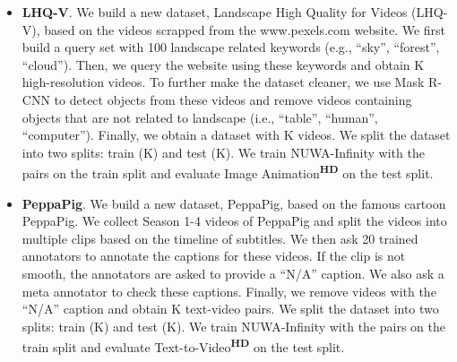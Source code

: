 \documentclass{article}
\begin{document}
\begin{itemize}[leftmargin=*]
\item \textbf{LHQ-V}. We build a new dataset, Landscape High Quality for Videos (LHQ-V), based on the videos scrapped from the www.pexels.com website. We first build a query set with 100 landscape related keywords (e.g., ``sky'', ``forest'', ``cloud''). Then, we query the website using these keywords and obtain K high-resolution videos. To further make the dataset cleaner, we use Mask R-CNN \cite{heMaskRCNN2017} to detect objects from these videos and remove videos containing objects that are not related to landscape (i.e., ``table'', ``human'', ``computer''). Finally, we obtain a dataset with K videos. We split the dataset into two splits: train (K) and test (K). We train NUWA-Infinity with the  pairs on the train split and evaluate Image Animation\textsuperscript{\textbf{HD}} on the test split.

\item \textbf{PeppaPig}. We build a new dataset, PeppaPig, based on the famous cartoon PeppaPig. We collect Season 1-4 videos of PeppaPig and split the videos into multiple clips based on the timeline of subtitles. We then ask 20 trained annotators to annotate the captions for these videos. If the clip is not smooth, the annotators are asked to provide a ``N/A'' caption. We also ask a meta annotator to check these captions. Finally, we remove videos with the ``N/A'' caption and obtain K text-video pairs. We split the dataset into two splits: train (K) and test (K). We train NUWA-Infinity with the  pairs on the train split and evaluate Text-to-Video\textsuperscript{\textbf{HD}} on the test split.
\end{itemize}
\end{document}
